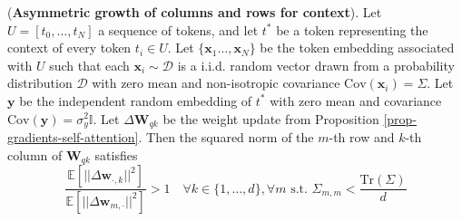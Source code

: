 \begin{proposition}
\label{prop-gradient-asymmetric-growth-rows-columns}
%
(\textbf{Asymmetric growth of columns and rows for context}).
%
Let $U = [t_0, \dots, t_N]$ a sequence of tokens, and let $t^*$ be a token representing the context of every token $t_i \in U$.
%
Let $\{\bm{x}_1 \dots, \bm{x}_N\}$ be the token embedding associated with $U$ such that each $\bm{x}_i \sim \mathcal{D}$ is a i.i.d. random vector drawn from a probability distribution $\mathcal{D}$ with zero mean and non-isotropic covariance $\text{Cov}(\bm{x}_i)  = \Sigma$.
%
Let $\bm{y}$ be the independent random embedding of $t^*$ with zero mean and covariance $\text{Cov}(\bm{y})  = \sigma_y^2\mathbb{I}$.
%
Let $\Delta \bm{W}_{qk}$ be the weight update from Proposition \ref{prop-gradients-self-attention}.
%
Then the squared norm of the $m$-th row and $k$-th column of $\bm{W}_{qk}$ satisfies
%
\begin{equation}
\frac{\mathbb{E}\left[ ||\Delta \bm{w}_{\cdot, k}||^2 \right]}{\mathbb{E}\left[ ||\Delta \bm{w}_{m, \cdot}||^2 \right]} > 1 \quad \forall k \in \{1,\dots,d\}, \forall m \,\,\text{s.t.} \,\, \Sigma_{m,m} < \frac{\text{Tr}(\Sigma)}{d}
\end{equation}
%
\end{proposition}